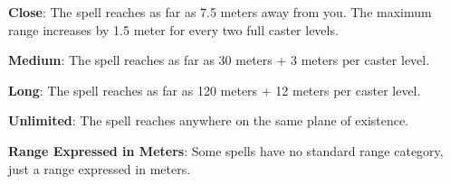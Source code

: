 \textbf{Close}: The spell reaches as far as 7.5 meters away from you. The maximum range increases by 1.5 meter for every two full caster levels.

\textbf{Medium}: The spell reaches as far as 30 meters + 3 meters per caster level.

\textbf{Long}: The spell reaches as far as 120 meters + 12 meters per caster level.

\textbf{Unlimited}: The spell reaches anywhere on the same plane of existence.

\textbf{Range Expressed in Meters}: Some spells have no standard range category, just a range expressed in meters.